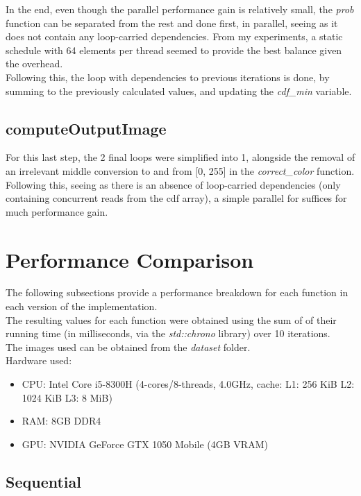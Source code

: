 \documentclass[sigconf]{acmart}
\begin{document}
In the end, even though the parallel performance gain is relatively small, the \textit{prob} function can be separated from the rest and done first, in parallel, seeing as it does not contain any loop-carried dependencies. From my experiments, a static schedule with 64 elements per thread seemed to provide the best balance given the overhead.\\
Following this, the loop with dependencies to previous iterations is done, by summing to the previously calculated values, and updating the \textit{cdf\_min} variable.

\subsection{computeOutputImage}

For this last step, the 2 final loops were simplified into 1, alongside the removal of an irrelevant middle conversion to and from [0, 255] in the \textit{correct\_color} function.\\
Following this, seeing as there is an absence of loop-carried dependencies (only containing concurrent reads from the cdf array), a simple parallel for suffices for much performance gain.

\section{Performance Comparison}

The following subsections provide a performance breakdown for each function in each version of the implementation.\\

The resulting values for each function were obtained using the sum of of their running time (in milliseconds, via the \textit{std::chrono} library) over 10 iterations.\\
The images used can be obtained from the \textit{dataset} folder.\\

Hardware used: 
\begin{itemize}
    \item CPU: Intel Core i5-8300H (4-cores/8-threads, 4.0GHz, cache: L1: 256 KiB L2: 1024 KiB L3: 8 MiB)
    \item RAM: 8GB DDR4
    \item GPU: NVIDIA GeForce GTX 1050 Mobile (4GB VRAM)
\end{itemize}

\subsection{Sequential}
\end{document}
